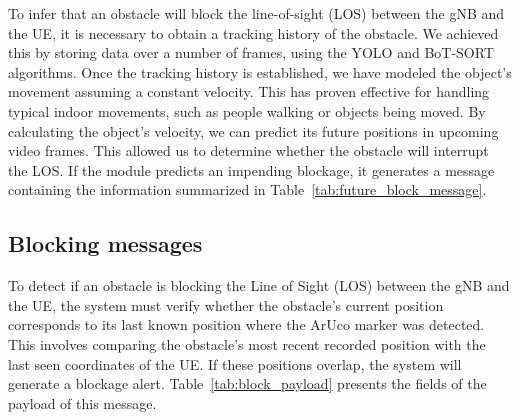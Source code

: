 To infer that an obstacle will block the line-of-sight (LOS) between the gNB and the UE, it is necessary to obtain a tracking history of the obstacle.
We achieved this by storing data over a number of frames, using the YOLO and BoT-SORT algorithms.
Once the tracking history is established, we have modeled the object's movement assuming a constant velocity.
This has proven effective for handling typical indoor movements, such as people walking or objects being moved.
By calculating the object's velocity, we can predict its future positions in upcoming video frames.
This allowed us to determine whether the obstacle will interrupt the LOS\@.
If the module predicts an impending blockage, it generates a message containing the information summarized in Table~\ref{tab:future_block_message}.


\begin{table}[H]
    \caption{Components of the Prediction of Blockage Payload}
    \label{tab:future_block_message}
    \centering
\end{table}




\subsection{Blocking messages}\label{subsec:blocking-messages}
To detect if an obstacle is blocking the Line of Sight (LOS) between the gNB and the UE, the system must verify whether the obstacle’s current position corresponds to its last known position where the ArUco marker was detected.
This involves comparing the obstacle's most recent recorded position with the last seen coordinates of the UE\@.
If these positions overlap, the system will generate a blockage alert.
Table~\ref{tab:block_payload} presents the fields of the payload of this message.


